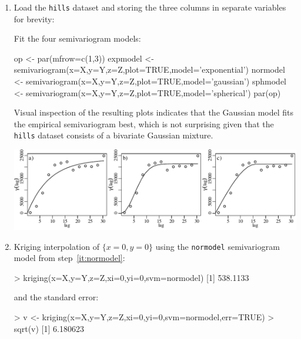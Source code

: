 \begin{enumerate}
  
\item\label{it:normodel} Load the \texttt{hills} dataset and storing
  the three columns in separate variables for brevity:


Fit the four semivariogram models:

\begin{script}[firstnumber=4]
op <- par(mfrow=c(1,3))
expmodel <- semivariogram(x=X,y=Y,z=Z,plot=TRUE,model='exponential')
normodel <- semivariogram(x=X,y=Y,z=Z,plot=TRUE,model='gaussian')
sphmodel <- semivariogram(x=X,y=Y,z=Z,plot=TRUE,model='spherical')
par(op)
\end{script}

Visual inspection of the resulting plots indicates that the Gaussian
model fits the empirical semivariogram best, which is not surprising
given that the \texttt{hills} dataset consists of a bivariate Gaussian
mixture.

\noindent\begin{minipage}[t][][b]{\linewidth}
\includegraphics[]{../figures/hills.pdf}
\end{minipage}
\begin{minipage}[t][][t]{\linewidth}
\end{minipage}

\item Kriging interpolation of $\{x=0,y=0\}$ using the
  \texttt{normodel} semivariogram model from step~\ref{it:normodel}:

\begin{console}
> kriging(x=X,y=Y,z=Z,xi=0,yi=0,svm=normodel)
[1] 538.1133
\end{console}

\noindent and the standard error:

\begin{console}
> v <- kriging(x=X,y=Y,z=Z,xi=0,yi=0,svm=normodel,err=TRUE)
> sqrt(v)
[1] 6.180623
\end{console}


\end{enumerate}
